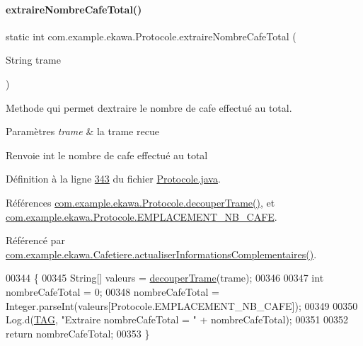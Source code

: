 \paragraph{\texorpdfstring{extraire\+Nombre\+Cafe\+Total()}{extraireNombreCafeTotal()}}
{\footnotesize\ttfamily static int com.\+example.\+ekawa.\+Protocole.\+extraire\+Nombre\+Cafe\+Total (\begin{DoxyParamCaption}\item[{String}]{trame }\end{DoxyParamCaption})\hspace{0.3cm}{\ttfamily [static]}}



Methode qui permet d\textquotesingle{}extraire le nombre de cafe effectué au total. 


\begin{DoxyParams}{Paramètres}
{\em trame} & la trame recue \\
\hline
\end{DoxyParams}
\begin{DoxyReturn}{Renvoie}
int le nombre de cafe effectué au total 
\end{DoxyReturn}


Définition à la ligne \hyperlink{_protocole_8java_source_l00343}{343} du fichier \hyperlink{_protocole_8java_source}{Protocole.\+java}.



Références \hyperlink{_protocole_8java_source_l00208}{com.\+example.\+ekawa.\+Protocole.\+decouper\+Trame()}, et \hyperlink{_protocole_8java_source_l00064}{com.\+example.\+ekawa.\+Protocole.\+E\+M\+P\+L\+A\+C\+E\+M\+E\+N\+T\+\_\+\+N\+B\+\_\+\+C\+A\+FE}.



Référencé par \hyperlink{_cafetiere_8java_source_l00574}{com.\+example.\+ekawa.\+Cafetiere.\+actualiser\+Informations\+Complementaires()}.


\begin{DoxyCode}
00344     \{
00345         String[] valeurs = \hyperlink{classcom_1_1example_1_1ekawa_1_1_protocole_a23c261e4ab5ad3c2ac60187f04ae40ea}{decouperTrame}(trame);
00346 
00347         \textcolor{keywordtype}{int} nombreCafeTotal = 0;
00348         nombreCafeTotal = Integer.parseInt(valeurs[Protocole.EMPLACEMENT\_NB\_CAFE]);
00349 
00350         Log.d(\hyperlink{classcom_1_1example_1_1ekawa_1_1_protocole_ae9b68fa0daac528421b887f19413f8f5}{TAG}, \textcolor{stringliteral}{"Extraire nombreCafeTotal = "} + nombreCafeTotal);
00351 
00352         \textcolor{keywordflow}{return} nombreCafeTotal;
00353     \}
\end{DoxyCode}
\mbox{\label{classcom_1_1example_1_1ekawa_1_1_protocole_ae4aa9859ca0f359284c931e31732477f}} 
